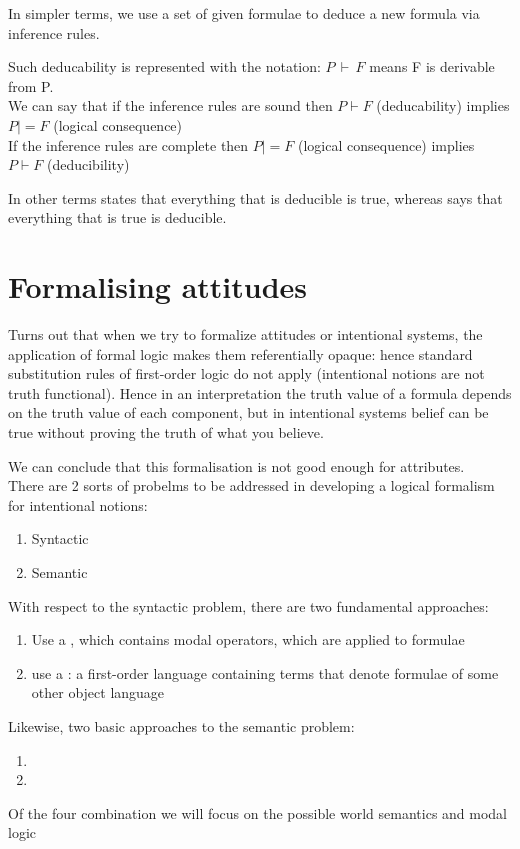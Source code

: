 \begin{itemize}
In simpler terms, we use a set of given formulae to deduce a new formula via inference rules.

Such deducability is represented with the notation:
$P\,\vdash \,F$ means F is derivable from P.\\
We can say that if the inference rules are sound then $P\vdash F$ (deducability) implies $P|=F$ (logical consequence)\\
If the inference rules are complete then  $P|=F$ (logical consequence) implies $P\vdash F$ (deducibility)

In other terms  states that everything that is deducible is true, whereas  says that everything that is true is deducible.
\end{itemize}

\section{Formalising attitudes}
Turns out that when we try to formalize attitudes or intentional systems, the application of formal logic makes them referentially opaque: hence standard substitution rules of first-order logic do not apply (intentional notions are not truth functional).
Hence in an interpretation the truth value of a formula depends on the truth value of each component, but in intentional systems belief can be true without proving the truth of what you believe.

We can conclude that this formalisation is not good enough for attributes. \\
There are 2 sorts of probelms to be addressed in developing a logical formalism for intentional notions:
\begin{enumerate}
\item Syntactic
\item Semantic
\end{enumerate}
With respect to the syntactic problem, there are two fundamental approaches:
\begin{enumerate}
\item Use a , which contains modal operators, which are applied to formulae
\item use a : a first-order language containing terms that denote formulae of some other object language
\end{enumerate}
Likewise, two basic approaches to the semantic problem:
\begin{enumerate}
\item {}
\item {}
\end{enumerate}
Of the four combination we will focus on the possible world semantics and modal logic


